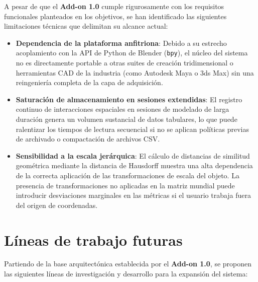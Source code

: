 A pesar de que el \textbf{Add-on 1.0} cumple rigurosamente con los requisitos funcionales planteados en los objetivos, se han identificado las siguientes limitaciones técnicas que delimitan su alcance actual:

\begin{itemize}
    \item \textbf{Dependencia de la plataforma anfitriona}: Debido a su estrecho acoplamiento con la API de Python de Blender (\texttt{bpy}), el núcleo del sistema no es directamente portable a otras suites de creación tridimensional o herramientas CAD de la industria (como Autodesk Maya o 3ds Max) sin una reingeniería completa de la capa de adquisición.
    \item \textbf{Saturación de almacenamiento en sesiones extendidas}: El registro continuo de interacciones espaciales en sesiones de modelado de larga duración genera un volumen sustancial de datos tabulares, lo que puede ralentizar los tiempos de lectura secuencial si no se aplican políticas previas de archivado o compactación de archivos CSV.
    \item \textbf{Sensibilidad a la escala jerárquica}: El cálculo de distancias de similitud geométrica mediante la distancia de Hausdorff muestra una alta dependencia de la correcta aplicación de las transformaciones de escala del objeto. La presencia de transformaciones no aplicadas en la matriz mundial puede introducir desviaciones marginales en las métricas si el usuario trabaja fuera del origen de coordenadas.
\end{itemize}

\section{Líneas de trabajo futuras}

Partiendo de la base arquitectónica establecida por el \textbf{Add-on 1.0}, se proponen las siguientes líneas de investigación y desarrollo para la expansión del sistema:

